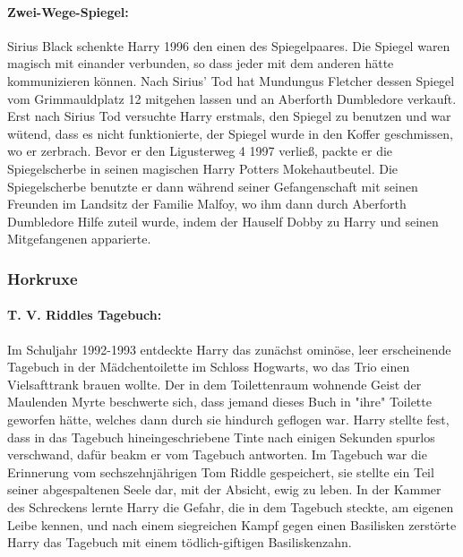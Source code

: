 \documentclass[a4paper, 10pt]{article}
\begin{document}
\paragraph{Zwei-Wege-Spiegel:}
Sirius Black schenkte Harry 1996 den einen des Spiegelpaares. Die Spiegel waren magisch mit einander verbunden, so dass jeder mit dem anderen hätte kommunizieren können. Nach Sirius' Tod hat Mundungus Fletcher dessen Spiegel vom Grimmauldplatz 12 mitgehen lassen und an Aberforth Dumbledore verkauft. Erst nach Sirius Tod versuchte Harry erstmals, den Spiegel zu benutzen und war wütend, dass es nicht funktionierte, der Spiegel wurde in den Koffer geschmissen,
wo er zerbrach. Bevor er den Ligusterweg 4 1997 verließ, packte er die Spiegelscherbe in seinen magischen Harry Potters Mokehautbeutel. Die Spiegelscherbe benutzte er dann während seiner Gefangenschaft mit seinen Freunden im Landsitz der Familie Malfoy, wo ihm dann durch Aberforth Dumbledore Hilfe zuteil wurde, indem der Hauself Dobby zu Harry und seinen Mitgefangenen apparierte.

\subsubsection*{\large Horkruxe}
\paragraph{T. V. Riddles Tagebuch:}
Im Schuljahr 1992-1993 entdeckte Harry das zunächst ominöse, leer erscheinende Tagebuch in der Mädchentoilette im Schloss Hogwarts, wo das Trio einen Vielsafttrank brauen wollte. Der in dem Toilettenraum wohnende Geist der Maulenden Myrte beschwerte sich, dass jemand dieses Buch in "ihre" Toilette geworfen hätte, welches dann durch sie hindurch geflogen war. Harry stellte fest, dass in das Tagebuch hineingeschriebene Tinte nach einigen Sekunden spurlos verschwand, dafür beakm er vom Tagebuch antworten. Im Tagebuch war die Erinnerung vom sechszehnjährigen Tom Riddle gespeichert, sie stellte ein Teil seiner abgespaltenen Seele dar, mit der Absicht, ewig zu leben. In der Kammer des Schreckens lernte Harry die Gefahr, die in dem Tagebuch steckte, am eigenen Leibe kennen, und nach einem siegreichen Kampf gegen einen Basilisken zerstörte Harry das Tagebuch mit einem tödlich-giftigen Basiliskenzahn.
\end{document}
